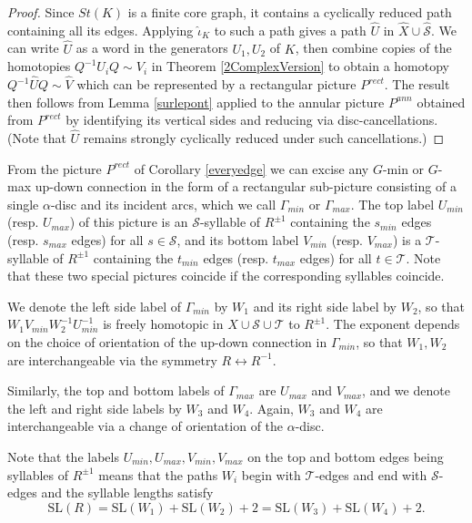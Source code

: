 \documentclass[12pt,a4paper]{amsart}
\def\wh{\widehat}
\def\G{\Gamma}
\def\a{\alpha}
\def\cS{\mathcal{S}}
\def\cT{\mathcal{T}}
\begin{document}
 \begin{proof}
 	Since $St(K)$ is a  finite core graph, it contains a cyclically reduced path containing all its edges.
 	Applying $\wh\iota_K$ to such a path gives a path $\wh{U}$ in $\wh{X}\cup\wh{\cS}$.
 	 We can write $\wh U$  as a word in the generators $U_1,U_2$ of $K$, 
 	 then combine copies of the homotopies $Q^{-1}U_iQ\sim V_i$ in  Theorem \ref{2ComplexVersion} to obtain a homotopy  $Q^{-1}\wh{U}Q\sim \wh{V}$ which can be represented by a rectangular picture $P^{rect}$.  
 	 The result then follows from Lemma \ref{surlepont} applied to the annular picture $P^{ann}$ obtained from $P^{rect}$ by identifying its vertical sides and reducing via disc-cancellations. (Note that $\wh U$ remains strongly cyclically reduced under such cancellations.)
 \end{proof}
 
   From the picture $P^{rect}$ of Corollary \ref{everyedge}
 we can excise any  $G$-min or $G$-max up-down connection in the form of a rectangular sub-picture consisting of a single $\a$-disc and its incident arcs, which we call $\G_{min}$ or $\G_{max}$. 
  The top label  $U_{min}$ (resp. $U_{max}$) of this picture is an $\cS$-syllable of $R^{\pm 1}$ containing   the $s_{min}$ edges (resp. $s_{max}$ edges) 
 for all $s\in \cS$, and its bottom label $V_{min}$ (resp. $V_{max}$)
 is a $\cT$-syllable of $R^{\pm 1}$ containing
 the   $t_{min}$ edges (resp. $t_{max}$ edges) 
 for all $t\in \cT$.
  Note that these two special pictures 
 coincide if the corresponding syllables coincide.

  
 We denote the left side label of $\G_{min}$  
 by $W_1$ and its right side label by $W_2$, so that $W_1V_{min}W_2^{-1}U_{min}^{-1}$ is freely homotopic 
  in $X\cup\cS\cup\cT$ to $R^{\pm1}$.  The exponent depends on the choice of orientation of the up-down connection in $\G_{min}$, so that $W_1,W_2$ are interchangeable via the symmetry $R\leftrightarrow R^{-1}$.
 
 Similarly,  the top and bottom labels of $\G_{max}$ are $U_{max}$ and $V_{max}$, and we denote the left and right side labels by $W_3$ and $W_4$.  Again, $W_3$ and $W_4$ are interchangeable via a change of orientation of the $\a$-disc.
 
 
 Note that the labels $U_{min}, U_{max}, V_{min},V_{max}$ on the top and bottom edges being syllables of $R^{\pm1}$ 
 means that the paths   $W_i$ begin with  $\cT$-edges 
 and end with $\cS$-edges and  
 the syllable lengths satisfy  
$$\text{SL}(R) = \text{SL}(W_1) + \text{SL}(W_2) + 2 = \text{SL}(W_3) + \text{SL}(W_4) + 2.$$
 
\end{document}
